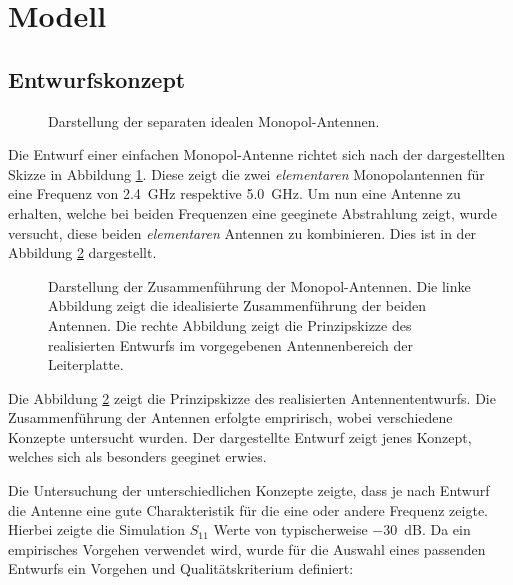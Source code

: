 \section{Modell}

\subsection{Entwurfskonzept}

\begin{figure}[h!]
	\centering
	\def\svgscale{0.75}
	
	\caption{Darstellung der separaten idealen Monopol-Antennen.}
	\label{fig:antenna_concept_1}
\end{figure}

Die Entwurf einer einfachen Monopol-Antenne richtet sich nach der dargestellten
Skizze in Abbildung \ref{fig:antenna_concept_1}. Diese zeigt die zwei
\emph{elementaren} Monopolantennen für eine Frequenz von \SI{2.4}{\giga\hertz}
respektive \SI{5.0}{\giga\hertz}. Um nun eine Antenne zu erhalten, welche bei
beiden Frequenzen eine geeginete Abstrahlung zeigt, wurde versucht, diese
beiden \emph{elementaren} Antennen zu kombinieren. Dies ist in der
Abbildung \ref{fig:antenna_concept_2} dargestellt. 

\begin{figure}[h!]
	\centering
	\def\svgscale{0.75}
	
	\caption[Darstellung der Zusammenführung der Monopol-Antennen.]{
		Darstellung der Zusammenführung der Monopol-Antennen.
		Die linke Abbildung zeigt die idealisierte Zusammenführung
		der beiden Antennen. Die rechte Abbildung zeigt die
		Prinzipskizze des realisierten Entwurfs im vorgegebenen
		Antennenbereich der Leiterplatte.}
	\label{fig:antenna_concept_2}
\end{figure}

Die Abbildung \ref{fig:antenna_concept_2} zeigt die Prinzipskizze des
realisierten Antennententwurfs. Die Zusammenführung der Antennen erfolgte
empririsch, wobei verschiedene Konzepte untersucht wurden. Der dargestellte
Entwurf zeigt jenes Konzept, welches sich als besonders geeginet erwies.

Die Untersuchung der unterschiedlichen Konzepte zeigte, dass je nach
Entwurf die Antenne eine gute Charakteristik für die eine oder andere
Frequenz zeigte. Hierbei zeigte die Simulation $S_{11}$ Werte von
typischerweise \SI{-30}{\dB}. Da ein empirisches Vorgehen verwendet
wird, wurde für die Auswahl eines passenden Entwurfs ein Vorgehen und
Qualitätskriterium definiert:

